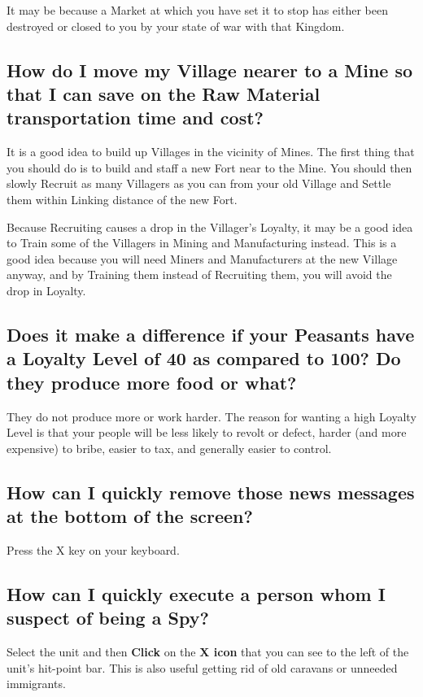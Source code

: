 It may be because a Market at which you have set it to stop has either been destroyed or closed to you by your state of war with that Kingdom.

\subsection{How do I move my Village nearer to a Mine so that I can save on the Raw Material transportation time and cost?}

It is a good idea to build up Villages in the vicinity of Mines. The first thing that you should do is to build and staff a new Fort near to the Mine. You should then slowly Recruit as many Villagers as you can from your old Village and Settle them within Linking distance of the new Fort.

Because Recruiting causes a drop in the Villager’s Loyalty, it may be a good idea to Train some of the Villagers in Mining and Manufacturing instead. This is a good idea because you will need Miners and Manufacturers at the new Village anyway, and by Training them instead of Recruiting them, you will avoid the drop in Loyalty.

\subsection{Does it make a difference if your Peasants have a Loyalty Level of 40 as compared to 100? Do they produce more food or what?}

They do not produce more or work harder. The reason for wanting a high Loyalty Level is that your people will be less likely to revolt or defect, harder (and more expensive) to bribe, easier to tax, and generally easier to control.

\subsection{How can I quickly remove those news messages at the bottom of the screen?}


Press the X key on your keyboard.

\subsection{How can I quickly execute a person whom I suspect of being a Spy?}


Select the unit and then \textbf{Click} on the \textbf{X icon} that you can see to the left of the unit’s hit-point bar. This is also useful getting rid of old caravans or unneeded immigrants.

